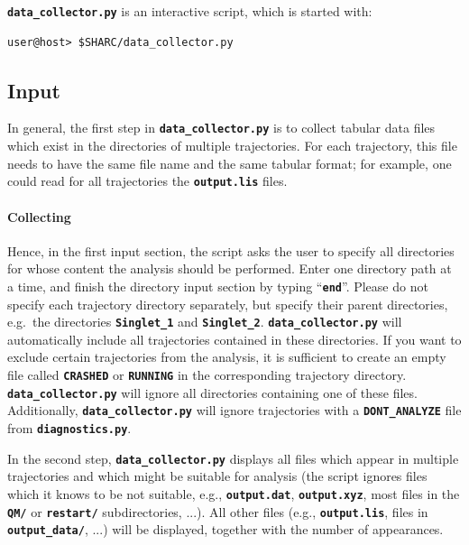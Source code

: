 \documentclass[a4paper,10pt,DIV=15,openany]{scrbook}
\newcommand{\ttt}[1]{\textbf{\texttt{#1}}}
\begin{document}
\ttt{data\_collector.py} is an interactive script, which is started with:
\begin{verbatim}
user@host> $SHARC/data_collector.py
\end{verbatim}

\subsection{Input}

In general, the first step in \ttt{data\_collector.py} is to collect tabular data files which exist in the directories of multiple trajectories.
For each trajectory, this file needs to have the same file name and the same tabular format; for example, one could read for all trajectories the \ttt{output.lis} files.

\paragraph{Collecting}

Hence, in the first input section, the script asks the user to specify all directories for whose content the analysis should be performed. Enter one directory path at a time, and finish the directory input section by typing ``\ttt{end}''. Please do not specify each trajectory directory separately, but specify their parent directories, e.g.\ the directories \ttt{Singlet\_1} and \ttt{Singlet\_2}. \ttt{data\_collector.py} will automatically include all trajectories contained in these directories.
If you want to exclude certain trajectories from the analysis, it is sufficient to create an empty file called \ttt{CRASHED} or \ttt{RUNNING} in the corresponding trajectory directory. \ttt{data\_collector.py} will ignore all directories containing one of these files.
Additionally, \ttt{data\_collector.py} will ignore trajectories with a \ttt{DONT\_ANALYZE} file from \ttt{diagnostics.py}.

In the second step, \ttt{data\_collector.py} displays all files which appear in multiple trajectories and which might be suitable for analysis (the script ignores files which it knows to be not suitable, e.g., \ttt{output.dat}, \ttt{output.xyz}, most files in the \ttt{QM/} or \ttt{restart/} subdirectories, ...). 
All other files (e.g., \ttt{output.lis}, files in \ttt{output\_data/}, ...) will be displayed, together with the number of appearances.
\end{document}
